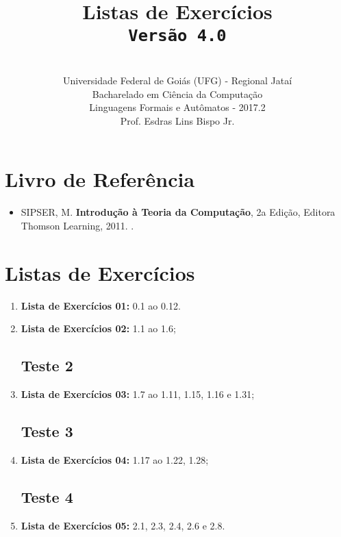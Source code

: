 \documentclass[12pt,a4paper,oneside]{article}
\author{\\Universidade Federal de Goiás (UFG) - Regional Jataí\\Bacharelado em Ciência da Computação \\Linguagens Formais e Autômatos - 2017.2 \\Prof. Esdras Lins Bispo Jr.}
\date{}
\title{
	\sc \huge Listas de Exercícios
	\\{\tt Versão 4.0}
}
\begin{document}
\maketitle

\section{Livro de Referência}
	\begin{itemize}
		\item SIPSER, M. {\bf Introdução à Teoria da Computação}, 2a Edição, Editora Thomson Learning, 2011. \color{blue}{\bf Código Bib.: [004 SIP/int]}.
	\end{itemize}
	
\section{Listas de Exercícios}

\begin{enumerate}

	\subsection{Teste 1}
	\item[] {\bf Lista de Exercícios 01:} 0.1 ao 0.12.
	\item[] {\bf Lista de Exercícios 02:} 1.1 ao 1.6;
	
	\subsection{Teste 2}
	\item[] {\bf Lista de Exercícios 03:} 1.7 ao 1.11, 1.15, 1.16 e 1.31; 
	
	\subsection{Teste 3}
	\item[] {\bf Lista de Exercícios 04:} 1.17 ao 1.22, 1.28;
	
	\subsection{Teste 4}
	\item[] {\bf Lista de Exercícios 05:} 2.1, 2.3, 2.4, 2.6 e 2.8.
	
\end{enumerate}
\end{document}
